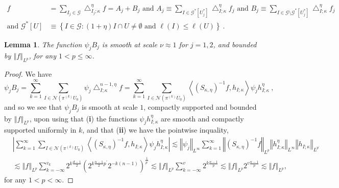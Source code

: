\documentclass{amsart}%
\theoremstyle{plain}
\newtheorem{lemma}[theorem]{Lemma}
\numberwithin{equation}{section}
\begin{document}
\begin{align}
f  & =\sum_{I_{j}\in\mathcal{G}}\bigtriangleup_{I_{j};\kappa}^{\eta}%
f=A_{j}+B_{j}\text{ and }A_{j}\equiv\sum_{I\in\mathcal{G}^{\ast}\left[
U_{j}^{\ast}\right]  }\bigtriangleup_{I;\kappa}^{\eta}f_{j}\text{ and }%
B_{j}\equiv\sum_{I\in\mathcal{G\setminus G}^{\ast}\left[  U_{j}^{\ast}\right]
}\bigtriangleup_{I;\kappa}^{\eta}f_{j}\label{f decomp}\\
\text{and }\mathcal{G}^{\ast}\left[  U\right]   & \equiv\left\{
I\in\mathcal{G}:\left(  1+\eta\right)  I\cap U\neq\emptyset\text{ and }%
\ell\left(  I\right)  \leq\ell\left(  U\right)  \right\}  \ .\nonumber
\end{align}


\begin{lemma}
The function $\psi_{j}B_{j}$ is smooth at scale $\nu\approx1$ for $j=1,2$, and
bounded by $\left\Vert f\right\Vert _{L^{p}}$, for any $1<p\leq\infty$.
\end{lemma}

\begin{proof}
We have%
\[
\psi_{j}B_{j}=\sum_{k=1}^{\infty}\sum_{I\in\mathcal{N}\left(  \pi^{\left(
k\right)  }U_{0}\right)  }\psi_{j}\bigtriangleup_{I;\kappa}^{n-1,\eta}%
f=\sum_{k=1}^{\infty}\sum_{I\in\mathcal{N}\left(  \pi^{\left(  k\right)
}U_{0}\right)  }\left\langle \left(  S_{\kappa,\eta}\right)  ^{-1}%
f,h_{I;\kappa}\right\rangle \psi_{j}h_{I;\kappa}^{\eta}\ ,
\]
and so we see that $\psi_{j}B_{j}$ is smooth at scale $1$, compactly supported
and bounded by $\left\Vert f\right\Vert _{L^{p}}$, upon using that
(\textbf{i}) the functions $\psi_{j}h_{I;\kappa}^{\eta}$ are smooth and
compactly supported uniformly in $k$, and that (\textbf{ii}) we have the
pointwise inquality,
\begin{align*}
& \left\vert \sum_{k=1}^{\infty}\sum_{I\in\mathcal{N}\left(  \pi^{\left(
k\right)  }U_{0}\right)  }\left\langle \left(  S_{\kappa,\eta}\right)
^{-1}f,h_{I;\kappa}\right\rangle \psi_{j}h_{I;\kappa}^{\eta}\right\vert
\lesssim\left\Vert \psi_{j}\right\Vert _{L^{\infty}}\sum_{k=1}^{\infty
}\left\Vert \left(  S_{\kappa,\eta}\right)  ^{-1}f\right\Vert _{L^{p}%
}\left\Vert h_{I;\kappa}^{\eta}\right\Vert _{L^{\infty}}\left\Vert
h_{I;\kappa}\right\Vert _{L^{p^{\prime}}}\\
& \lesssim\left\Vert f\right\Vert _{L^{p}}\sum_{k=-\infty}^{v_{k}}%
2^{k\frac{d-1}{2}}\left(  2^{k\frac{n-1}{2}p^{\prime}}2^{-k\left(  n-1\right)
}\right)  ^{\frac{1}{p^{\prime}}}\lesssim\left\Vert f\right\Vert _{L^{p}}%
\sum_{k=-\infty}^{v}2^{k\frac{n-1}{p}}\lesssim\left\Vert f\right\Vert _{L^{p}%
}2^{v\frac{n-1}{p}}\lesssim\left\Vert f\right\Vert _{L^{p}},
\end{align*}
for any $1<p<\infty$.
\end{proof}
\end{document}
